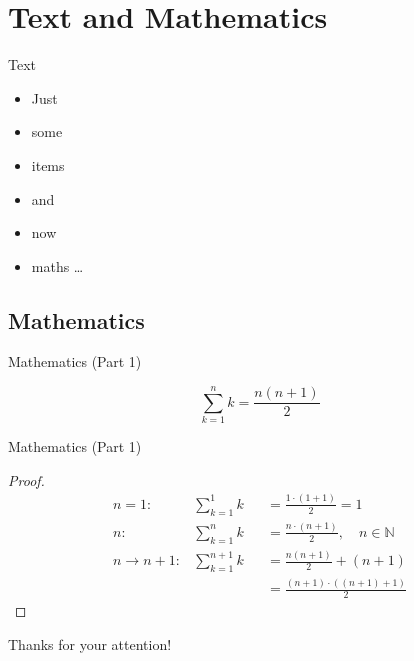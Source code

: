 \section{Text and Mathematics}
\begin{frame}{Text}
	\begin{itemize}
		\item Just
		\item some
		\item items
		\item and
		\item now
		\item maths \dots
	\end{itemize}
\end{frame}


\subsection[Maths]{Mathematics}
\begin{frame}{Mathematics (Part 1)}
 	\begin{corollary}
 	\[
 	\sum_{k=1}^n k = \frac{n(n + 1)}{2}
 	\]
 	\end{corollary}
\end{frame}


\begin{frame}{Mathematics (Part 1)}
 	\begin{proof}
	 	\begin{align}
 			n = 1: & \sum_{k=1}^1 k & &= \frac{1 \cdot (1 + 1)}{2} = 1\\
 			n: & \sum_{k=1}^n k & & = \frac{n \cdot (n + 1)}{2}, \quad n \in \mathbb{N}\\
 			n \rightarrow n+1: & \sum_{k=1}^{n+1} k & & = \frac{n(n + 1)}{2} + (n + 1)\\
 			& & &= \frac{(n + 1) \cdot ((n + 1) + 1)}{2}
 		\end{align}
 	\end{proof}
\end{frame}


\begin{frame}{Thanks for your attention!}
	\printbibliography
\end{frame}
